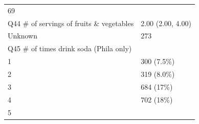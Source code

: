 \documentclass[]{article}
\begin{document}
\begin{longtable}[]{@{}ll@{}}
\begin{minipage}[t]{0.23\columnwidth}
69\strut
\end{minipage}\tabularnewline
\begin{minipage}[t]{0.71\columnwidth}\raggedright
Q44 \# of servings of fruits \& vegetables\strut
\end{minipage} & \begin{minipage}[t]{0.23\columnwidth}\raggedright
2.00 (2.00, 4.00)\strut
\end{minipage}\tabularnewline
\begin{minipage}[t]{0.71\columnwidth}\raggedright
Unknown\strut
\end{minipage} & \begin{minipage}[t]{0.23\columnwidth}\raggedright
273\strut
\end{minipage}\tabularnewline
\begin{minipage}[t]{0.71\columnwidth}\raggedright
Q45 \# of times drink soda (Phila only)\strut
\end{minipage} & \begin{minipage}[t]{0.23\columnwidth}\raggedright
\strut
\end{minipage}\tabularnewline
\begin{minipage}[t]{0.71\columnwidth}\raggedright
1\strut
\end{minipage} & \begin{minipage}[t]{0.23\columnwidth}\raggedright
300 (7.5\%)\strut
\end{minipage}\tabularnewline
\begin{minipage}[t]{0.71\columnwidth}\raggedright
2\strut
\end{minipage} & \begin{minipage}[t]{0.23\columnwidth}\raggedright
319 (8.0\%)\strut
\end{minipage}\tabularnewline
\begin{minipage}[t]{0.71\columnwidth}\raggedright
3\strut
\end{minipage} & \begin{minipage}[t]{0.23\columnwidth}\raggedright
684 (17\%)\strut
\end{minipage}\tabularnewline
\begin{minipage}[t]{0.71\columnwidth}\raggedright
4\strut
\end{minipage} & \begin{minipage}[t]{0.23\columnwidth}\raggedright
702 (18\%)\strut
\end{minipage}\tabularnewline
\begin{minipage}[t]{0.71\columnwidth}\raggedright
5\strut
\end{minipage} & \begin{minipage}[t]{0.23\columnwidth}\raggedright

\end{minipage}
\end{longtable}
\end{document}
